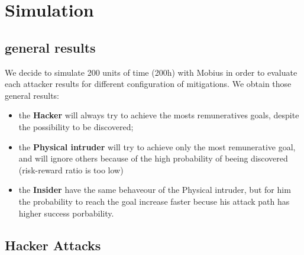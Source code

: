 %
\chapter{Simulation}\label{ch:simulation}
\section{general results}
We decide to simulate 200 units of time (200h) with Mobius in order to evaluate each attacker results for 
different configuration of mitigations. We obtain those general results:\\
\begin{itemize}
    \item the \textbf{Hacker} will always try to achieve the mosts remuneratives goals, despite the
        possibility to be discovered; 
    \item the \textbf{Physical intruder} will try to achieve only the most remunerative goal, and will
        ignore others because of the high probability of beeing discovered (risk-reward ratio is too low)
    \item the \textbf{Insider} have the same behaveour of the Physical intruder, but for him the probability
        to reach the goal increase faster becuse his attack path has higher success porbability.
\end{itemize}
\newpage
\section{Hacker Attacks}
